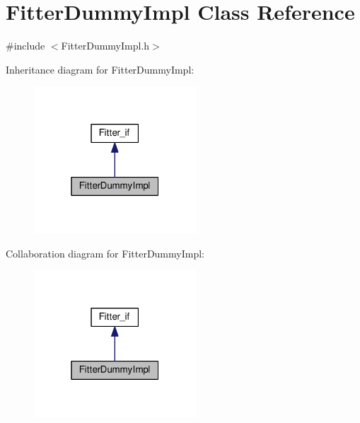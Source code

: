 \hypertarget{class_fitter_dummy_impl}{}\section{Fitter\+Dummy\+Impl Class Reference}
\label{class_fitter_dummy_impl}


{\ttfamily \#include $<$Fitter\+Dummy\+Impl.\+h$>$}



Inheritance diagram for Fitter\+Dummy\+Impl\+:
\nopagebreak
\begin{figure}[H]
\begin{center}
\leavevmode
\includegraphics[width=172pt]{class_fitter_dummy_impl__inherit__graph}
\end{center}
\end{figure}


Collaboration diagram for Fitter\+Dummy\+Impl\+:
\nopagebreak
\begin{figure}[H]
\begin{center}
\leavevmode
\includegraphics[width=172pt]{class_fitter_dummy_impl__coll__graph}
\end{center}
\end{figure}
